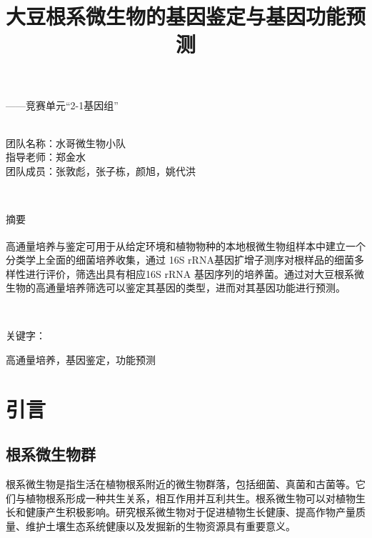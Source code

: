 \documentclass[UTF8]{ctexart}
\author{}
\date{}
\title{\vspace*{-1.5cm} \CJKfontspec{SimHei}大豆根系微生物的基因鉴定与基因功能预测}
\begin{document}
    \maketitle\thispagestyle{fancy}
    \vspace*{-1.5cm}

    {\raggedleft
    { \heiti  ——竞赛单元“2-1基因组”}}

    ~\\

    {\raggedleft
        团队名称：水哥微生物小队\\
        指导老师：郑金水\\
        团队成员：张敦彪，张子栋，颜旭，姚代洪\\}
    
    ~\\

    {\raggedright
    { \heiti 摘要}}

    高通量培养与鉴定\textsuperscript{\cite{ref1}}可用于从给定环境和植物物种的本地根微生物组样本中建立一个分类学上全面的细菌培养收集，通过 16S rRNA基因扩增子测序对根样品的细菌多样性进行评价，筛选出具有相应16S rRNA 基因序列的培养菌。通过对大豆根系微生物的高通量培养筛选可以鉴定其基因的类型，进而对其基因功能进行预测。
    
    ~\\

    {\heiti {} \raggedright 关键字：} { 高通量培养，基因鉴定，功能预测}

    




    \section{引言}

    \subsection{根系微生物群}

    根系微生物是指生活在植物根系附近的微生物群落，包括细菌、真菌和古菌等。它们与植物根系形成一种共生关系，相互作用并互利共生。根系微生物可以对植物生长和健康产生积极影响。研究根系微生物对于促进植物生长健康、提高作物产量质量、维护土壤生态系统健康以及发掘新的生物资源具有重要意义。
    
\end{document}
